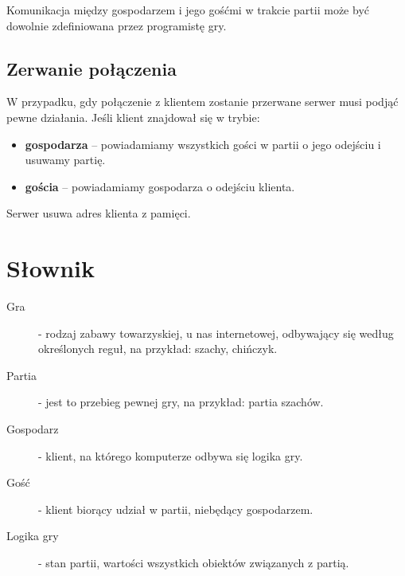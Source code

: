\documentclass[a4paper, 12pt]{article}
\begin{document}
Komunikacja między gospodarzem i jego gośćmi w trakcie partii może być dowolnie zdefiniowana przez programistę gry.

\subsection{Zerwanie połączenia}
W przypadku, gdy połączenie z klientem zostanie przerwane serwer musi podjąć pewne działania. Jeśli klient znajdował się w trybie:
\begin{itemize}
 \item \textbf{gospodarza} -- powiadamiamy wszystkich gości w partii o jego odejściu i usuwamy partię.
 \item \textbf{gościa} -- powiadamiamy gospodarza o odejściu klienta.
\end{itemize}
Serwer usuwa adres klienta z pamięci.


\section{Słownik}
\begin{description}
 \item[Gra] - rodzaj zabawy towarzyskiej, u nas internetowej, odbywający się według określonych reguł, na przykład: szachy, chińczyk.
 \item[Partia] - jest to przebieg pewnej gry, na przykład: partia szachów.
 \item[Gospodarz] - klient, na którego komputerze odbywa się logika gry.
 \item[Gość] - klient biorący udział w partii, niebędący gospodarzem.
 \item[Logika gry] - stan partii, wartości wszystkich obiektów związanych z partią.
\end{description}
\end{document}
